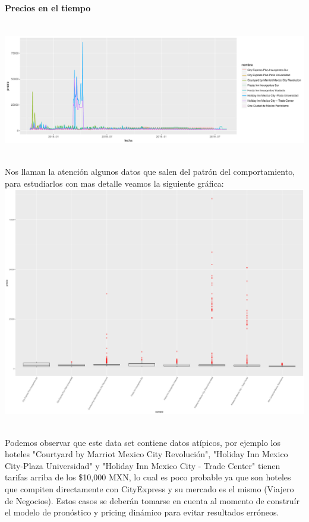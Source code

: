 \documentclass{article}\usepackage[]{graphicx}\usepackage[]{color}
\makeatletter
\def\maxwidth{ %
  \ifdim\Gin@nat@width>\linewidth
    \linewidth
  \else
    \Gin@nat@width
  \fi
}
\newenvironment{knitrout}{}{} %
\makeatother
\begin{document}
\paragraph{Precios en el tiempo} ~\\
\begin{knitrout}
\color{fgcolor}
\includegraphics[width=\maxwidth]{figures/PreciosGraf-1} 

\end{knitrout}
~\\
Nos llaman la atención algunos datos que salen del patrón del comportamiento, para estudiarlos con mas detalle veamos la siguiente gráfica:
~\\
\begin{knitrout}
\color{fgcolor}
\includegraphics[width=\maxwidth]{figures/PreciosBoxPlot-1} 

\end{knitrout}
~\\
Podemos observar que este data set contiene datos atípicos, por ejemplo los hoteles "Courtyard by Marriot Mexico City Revolución", "Holiday Inn Mexico City-Plaza Universidad" y "Holiday Inn Mexico City - Trade Center" tienen tarifas arriba de los \$10,000 MXN, lo cual es poco probable ya que son hoteles que compiten directamente con CityExpress y su mercado es el mismo (Viajero de Negocios). Estos casos se deberán tomarse en cuenta al momento de construír el modelo de pronóstico y pricing dinámico para evitar resultados erróneos. 
\end{document}

